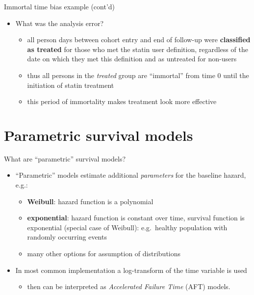 \documentclass[
  ignorenonframetext,
]{beamer}
\providecommand{\tightlist}{%
  \setlength{\itemsep}{0pt}\setlength{\parskip}{0pt}}
\begin{document}
\begin{frame}{Immortal time bias example (cont'd)}
\protect\hypertarget{immortal-time-bias-example-contd}{}

\begin{itemize}
\tightlist
\item
  What was the analysis error?

  \begin{itemize}
  \tightlist
  \item
    all person days between cohort entry and end of follow-up were
    \textbf{classified as treated} for those who met the statin user
    definition, regardless of the date on which they met this definition
    and as untreated for non-users
  \item
    thus all persons in the \emph{treated} group are ``immortal'' from
    time 0 until the initiation of statin treatment
  \item
    this period of immortality makes treatment look more effective
  \end{itemize}
\end{itemize}

\end{frame}

\hypertarget{parametric-survival-models}{%
\section{Parametric survival models}\label{parametric-survival-models}}

\begin{frame}{What are ``parametric'' survival models?}
\protect\hypertarget{what-are-parametric-survival-models}{}

\begin{itemize}
\tightlist
\item
  ``Parametric'' models estimate additional \emph{parameters} for the
  baseline hazard, e.g.:

  \begin{itemize}
  \tightlist
  \item
    \textbf{Weibull}: hazard function is a polynomial
  \item
    \textbf{exponential}: hazard function is constant over time,
    survival function is exponential (special case of Weibull):
    e.g.~healthy population with randomly occurring events
  \item
    many other options for assumption of distributions
  \end{itemize}
\item
  In most common implementation a log-transform of the time variable is
  used

  \begin{itemize}
  \tightlist
  \item
    then can be interpreted as \emph{Accelerated Failure Time} (AFT)
    models.
  \end{itemize}
\end{itemize}

\end{frame}
\end{document}
